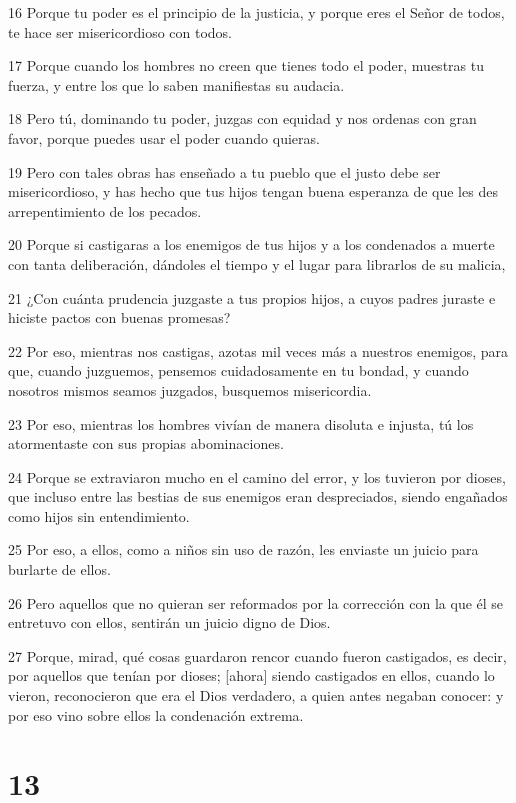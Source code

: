 \par 16 Porque tu poder es el principio de la justicia, y porque eres el Señor de todos, te hace ser misericordioso con todos.
\par 17 Porque cuando los hombres no creen que tienes todo el poder, muestras tu fuerza, y entre los que lo saben manifiestas su audacia.
\par 18 Pero tú, dominando tu poder, juzgas con equidad y nos ordenas con gran favor, porque puedes usar el poder cuando quieras.
\par 19 Pero con tales obras has enseñado a tu pueblo que el justo debe ser misericordioso, y has hecho que tus hijos tengan buena esperanza de que les des arrepentimiento de los pecados.
\par 20 Porque si castigaras a los enemigos de tus hijos y a los condenados a muerte con tanta deliberación, dándoles el tiempo y el lugar para librarlos de su malicia,
\par 21 ¿Con cuánta prudencia juzgaste a tus propios hijos, a cuyos padres juraste e hiciste pactos con buenas promesas?
\par 22 Por eso, mientras nos castigas, azotas mil veces más a nuestros enemigos, para que, cuando juzguemos, pensemos cuidadosamente en tu bondad, y cuando nosotros mismos seamos juzgados, busquemos misericordia.
\par 23 Por eso, mientras los hombres vivían de manera disoluta e injusta, tú los atormentaste con sus propias abominaciones.
\par 24 Porque se extraviaron mucho en el camino del error, y los tuvieron por dioses, que incluso entre las bestias de sus enemigos eran despreciados, siendo engañados como hijos sin entendimiento.
\par 25 Por eso, a ellos, como a niños sin uso de razón, les enviaste un juicio para burlarte de ellos.
\par 26 Pero aquellos que no quieran ser reformados por la corrección con la que él se entretuvo con ellos, sentirán un juicio digno de Dios.
\par 27 Porque, mirad, qué cosas guardaron rencor cuando fueron castigados, es decir, por aquellos que tenían por dioses; [ahora] siendo castigados en ellos, cuando lo vieron, reconocieron que era el Dios verdadero, a quien antes negaban conocer: y por eso vino sobre ellos la condenación extrema.

\chapter{13}

